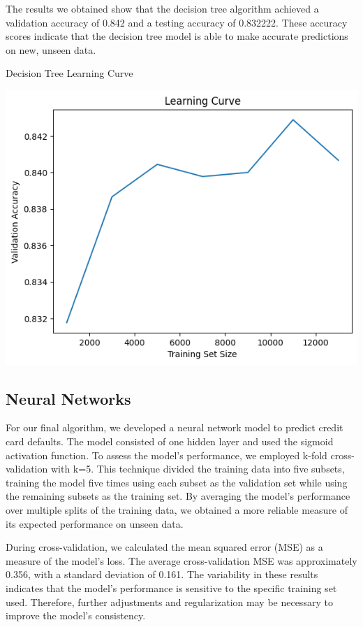 \documentclass[nohyperref]{article}
\theoremstyle{plain}
\theoremstyle{definition}
\theoremstyle{remark}
\begin{document}
The results we obtained show that the decision tree algorithm achieved a validation accuracy of 0.842 and a testing accuracy of 0.832222. These accuracy scores indicate that the decision tree model is able to make accurate predictions on new, unseen data. 

 Decision Tree Learning Curve

\includegraphics[scale=0.5]{Decision tree.png}

\subsection{Neural Networks}

For our final algorithm, we developed a neural network model to predict credit card defaults. The model consisted of one hidden layer and used the sigmoid activation function. To assess the model's performance, we employed k-fold cross-validation with k=5. This technique divided the training data into five subsets, training the model five times using each subset as the validation set while using the remaining subsets as the training set. By averaging the model's performance over multiple splits of the training data, we obtained a more reliable measure of its expected performance on unseen data.

During cross-validation, we calculated the mean squared error (MSE) as a measure of the model's loss. The average cross-validation MSE was approximately 0.356, with a standard deviation of 0.161. The variability in these results indicates that the model's performance is sensitive to the specific training set used. Therefore, further adjustments and regularization may be necessary to improve the model's consistency.
\end{document}
